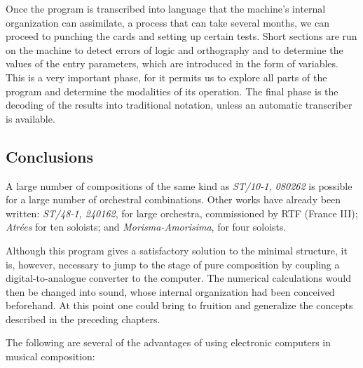 \documentclass[letterpaper, 11pt]{article}
\begin{document}
Once the program is transcribed into language that the machine's internal organization can
assimilate, a process that can take several months, we can proceed to punching the cards and setting
up certain tests. Short sections are run on the machine to detect errors of logic and orthography
and to determine the values of the entry parameters, which are introduced in the form of variables.
This is a very important phase, for it permits us to explore all parts of the program and determine
the modalities of its operation. The final phase is the decoding of the results into traditional
notation, unless an automatic transcriber is available.

\subsection*{Conclusions}

A large number of compositions of the same kind as \textit{ST/10-1, 080262} is possible for a large
number of orchestral combinations. Other works have already been written: \textit{ST/48-1, 240162},
for large orchestra, commissioned by RTF (France III); \textit{Atrées} for ten soloists; and
\textit{Morisma-Amorisima}, for four soloists.

Although this program gives a satisfactory solution to the minimal structure, it is, however,
necessary to jump to the stage of pure composition by coupling a digital-to-analogue converter to
the computer. The numerical calculations would then be changed into sound, whose internal
organization had been conceived beforehand. At this point one could bring to fruition and generalize
the concepts described in the preceding chapters.

The following are several of the advantages of using electronic computers in musical composition:
\end{document}
